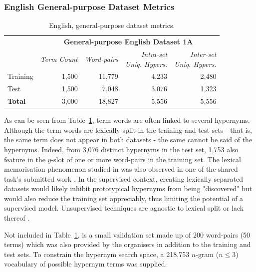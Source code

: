 \subsubsection{English General-purpose Dataset Metrics}
\begin{table}\centering
    \begin{tabular}{@{}lrrrr@{}} \toprule
    & \multicolumn{4}{c}{\textbf{General-purpose English Dataset 1A}} \\ \cmidrule{2-5}
    & \textit{Term Count} & \textit{Word-pairs} & \shortstack[r]{\textit{Intra-set}\\\textit{Uniq. Hypers.}} & \shortstack[r]{\textit{Inter-set}\\\textit{Uniq. Hypers.}} \\ \midrule
    Training & 1,500 & 11,779 & 4,233 & 2,480 \\
    Test & 1,500 & 7,048 & 3,076 & 1,323 \\ \midrule
    \textbf{Total} & 3,000 & 18,827 & 5,556 & 5,556 \\
    \bottomrule
    \end{tabular}
    \caption{English, general-purpose dataset metrics.}\label{tab:semeval_english_dataset_metrics}
\end{table}
As can be seen from Table~\ref{tab:semeval_english_dataset_metrics}, term words are often linked to several hypernyms.  Although the term words are lexically split in the training and test sets - that is, the same term does not appear in both datasets - the same cannot be said of the hypernyms.  Indeed, from 3,076 distinct hypernyms in the test set, 1,753 also feature in the $y$-slot of one or more word-pairs in the training set.  The lexical memorisation phenomenon studied in \citep{levy2015supervised} was also observed in one of the shared task's submitted work \citep{bernier2018crim}.  In the supervised context, creating lexically separated datasets would likely inhibit prototypical hypernyms from being "discovered" but would also reduce the training set appreciably, thus limiting the potential of a supervised model.  Unsupervised techniques are agnostic to lexical split or lack thereof \citep{shwartz2017siege}.

Not included in Table~\ref{tab:semeval_english_dataset_metrics}, is a small validation set made up of 200 word-pairs (50 terms) which was also provided by the organisers in addition to the training and test sets.  To constrain the hypernym search space, a 218,753 $n$-gram ($n \leq 3$) vocabulary of possible hypernym terms was supplied.  

